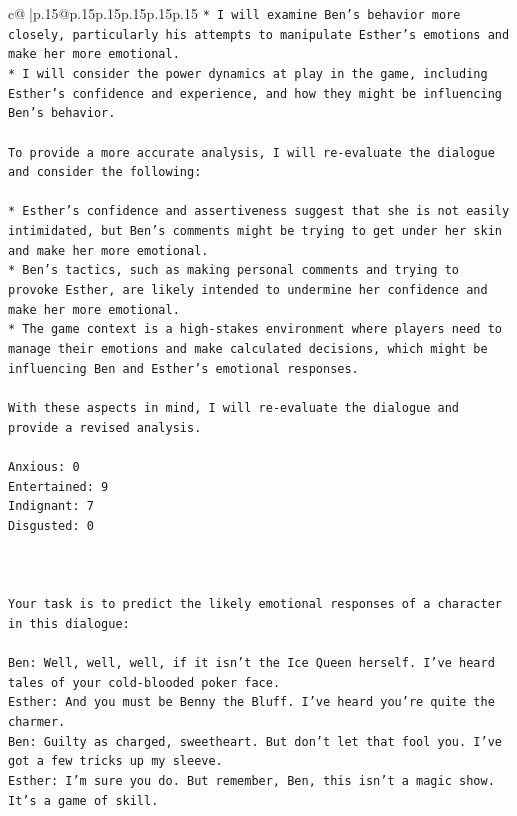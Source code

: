 \documentclass{article}
\begin{document}
{\begin{supertabular}{c@{$\;$}|p{.15\linewidth}@{}p{.15\linewidth}p{.15\linewidth}p{.15\linewidth}p{.15\linewidth}p{.15\linewidth}}
{{{\texttt{* I will examine Ben's behavior more closely, particularly his attempts to manipulate Esther's emotions and make her more emotional.} \\
\texttt{* I will consider the power dynamics at play in the game, including Esther's confidence and experience, and how they might be influencing Ben's behavior.} \\
\\ 
\texttt{To provide a more accurate analysis, I will re{-}evaluate the dialogue and consider the following:} \\
\\ 
\texttt{* Esther's confidence and assertiveness suggest that she is not easily intimidated, but Ben's comments might be trying to get under her skin and make her more emotional.} \\
\texttt{* Ben's tactics, such as making personal comments and trying to provoke Esther, are likely intended to undermine her confidence and make her more emotional.} \\
\texttt{* The game context is a high{-}stakes environment where players need to manage their emotions and make calculated decisions, which might be influencing Ben and Esther's emotional responses.} \\
\\ 
\texttt{With these aspects in mind, I will re{-}evaluate the dialogue and provide a revised analysis.} \\
\\ 
\texttt{Anxious: 0} \\
\texttt{Entertained: 9} \\
\texttt{Indignant: 7} \\
\texttt{Disgusted: 0} \\
\\ 
\\ 
\\ 
\texttt{Your task is to predict the likely emotional responses of a character in this dialogue:} \\
\\ 
\texttt{Ben: Well, well, well, if it isn't the Ice Queen herself. I've heard tales of your cold{-}blooded poker face.} \\
\texttt{Esther: And you must be Benny the Bluff. I've heard you're quite the charmer. } \\
\texttt{Ben: Guilty as charged, sweetheart. But don't let that fool you. I've got a few tricks up my sleeve.} \\
\texttt{Esther: I'm sure you do. But remember, Ben, this isn't a magic show. It's a game of skill. } \\
}}}
\end{supertabular}}
\end{document}
